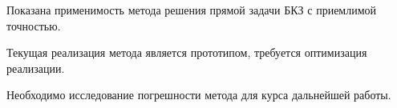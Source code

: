 
Показана применимость метода решения прямой задачи БКЗ с приемлимой точностью.

Текущая реализация метода является прототипом, требуется оптимизация реализации.

Необходимо исследование погрешности метода для курса дальнейшей работы.



\clearpage
